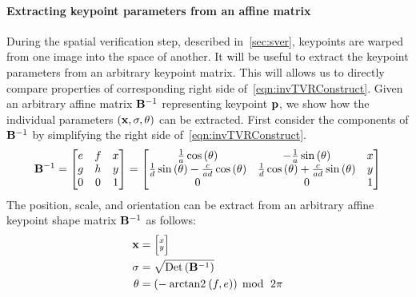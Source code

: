         \paragraph{Extracting keypoint parameters from an affine matrix}
        During the spatial verification step, described
          in~\cref{sec:sver}, keypoints are warped from one image into
          the space of another.
        It will be useful to extract the keypoint parameters from an
          arbitrary keypoint matrix.
        This will allows us to directly compare properties of
          corresponding right side of~\cref{eqn:invTVRConstruct}.
        Given an arbitrary affine matrix $\mathbf{B}^{-1}$ representing
          keypoint $\mathbf{p}$, we show how the individual parameters $(\mathbf{x},
          \sigma, \theta)$ can be extracted.
        First consider the components of $\mathbf{B}^{-1}$ by simplifying
          the right side of~\cref{eqn:invTVRConstruct}.
        \begin{equation}\label{eqn:ArbInvRVTMat}
            \mathbf{B}^{-1} = 
             \left[ \begin{matrix} 
            e & f & x\\
            g & h & y\\
            0 & 0 & 1
             \end{matrix} \right]  = 
             \left[ \begin{matrix} 
            \frac{1}{a} \cos{(\theta )}                                 & -\frac{1}{a} \sin{(\theta )}                                & x\\
            \frac{1}{d} \sin{(\theta )} - \frac{c}{a d} \cos{(\theta )} & \frac{1}{d} \cos{(\theta )} + \frac{c}{a d} \sin{(\theta )} & y\\
            0                                                           & 0                                                           & 1
             \end{matrix} \right] 
        \end{equation}
        The position, scale, and orientation can be extract from an
          arbitrary affine keypoint shape matrix $\mathbf{B}^{-1}$ as follows:
        \begin{equation}\label{eqn:affinewarp}
            \begin{aligned}
                \mathbf{x}     &=  \Bigl[\negthinspace \begin{smallmatrix} x\\y \end{smallmatrix} \negthinspace \Bigr]  \\
                \sigma  &= \sqrt{\mathbin{\textrm{Det}}\left(\mathbf{B}^{-1}\right)}\\
                \theta    &= \left(-\mathbin{\operatorname{arctan2}}\left(f, e\right)\right)\; \operatorname{mod}{} \;\,2\pi
            \end{aligned}
        \end{equation}
